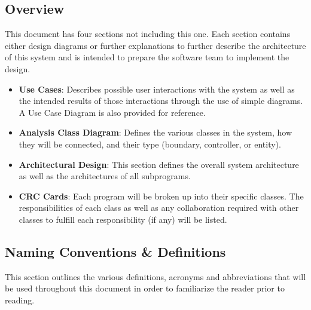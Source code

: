 \documentclass[titlepage]{article}
\begin{document}
\subsection{Overview}
This document has four sections not including this one. Each section contains either design diagrams or further explanations to further describe the architecture of this system and is intended to prepare the software team to implement the design.\\
\begin{itemize}
	\item \textbf{Use Cases}: Describes possible user interactions with the system as well as the intended results of those interactions through the use of simple diagrams. A Use Case Diagram is also provided for reference.\\
	\item \textbf{Analysis Class Diagram}: Defines the various classes in the system, how they will be connected, and their type (boundary, controller, or entity).\\
	\item \textbf{Architectural Design}: This section defines the overall system architecture as well as the architectures of all subprograms.\\
	\item \textbf{CRC Cards}: Each program will be broken up into their specific classes. The responsibilities of each class as well as any collaboration required with other classes to fulfill each responsibility (if any) will be listed.\\
\end{itemize}

\subsection{Naming Conventions \& Definitions}
This section outlines the various definitions, acronyms and abbreviations that will be used throughout this document in order to familiarize the reader prior to reading.
\end{document}
